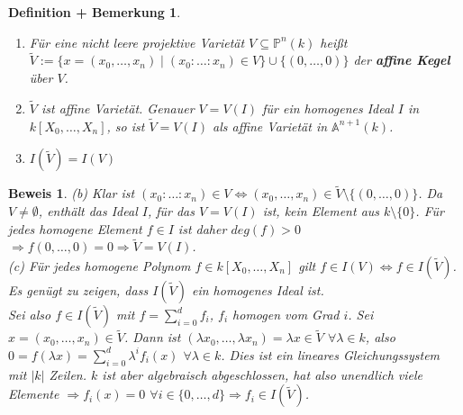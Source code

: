 \documentclass[a4paper,12pt]{report}
\theoremstyle{break}
\newtheorem{DefBem}[Def]{Definition + Bemerkung}
\theoremstyle{nonumberbreak}
\theoremstyle{nonumberplain}
\newtheorem{Bew}{Beweis}
\newcommand{\emp}[1]{\textbf{\emph{#1}}}
\newcommand{\begriff}[1]{{\index{#1}}\emp{#1}}
\begin{document}
\begin{DefBem}
 \label{defbem:8.10}
 \begin{enumerate}
  \item Für eine nicht leere projektive Varietät $V \subseteq \mathbb P^n(k)$ heißt \\
   $\tilde{V}:=\{x = (x_0,\dots ,x_n)\mid (x_0: \dots : x_n) \in V \} \cup \{(0, \dots, 0)\}$ der \begriff{affine Kegel} über $V$.
  \item $\tilde{V}$ ist affine Varietät. Genauer $V=V(I)$ für ein homogenes Ideal  $I$ in $k[X_0,\dots,X_n]$, so ist $\tilde{V}=V(I)$ als affine Varietät in $\mathbb A^{n+1}(k)$.
  \item $I(\tilde{V})=I(V)$
 \end{enumerate}
\end{DefBem}
\begin{Bew}
 (b) Klar ist $(x_0:\dots:x_n) \in V \Leftrightarrow (x_0, \dots , x_n) \in \tilde{V} \setminus \{(0,\dots,0)\}$. Da $V \ne \emptyset$, enthält das Ideal $I$, für das $V = V(I)$ ist, kein Element aus $k\setminus\{0\}$. Für jedes homogene Element $f \in I$ ist daher $deg(f) > 0$ $\Rightarrow f(0, \dots ,0)=0 \Rightarrow \tilde{V}=V(I)$. \\
 (c) Für jedes homogene Polynom $f \in k[X_0, \dots ,X_n]$ gilt $f \in I(V) \Leftrightarrow f \in I(\tilde{V})$. Es genügt zu zeigen, dass $I(\tilde{V})$ ein homogenes Ideal ist.\\
Sei also $f \in I(\tilde{V})$ mit $f= \sum_{i=0}^d{f_i}$, $f_i$ homogen vom Grad $i$. Sei $x=(x_0, \dots, x_n) \in \tilde{V}$. Dann ist $(\lambda x_0, \dots , \lambda x_n) = \lambda x \in \tilde{V}$ $\forall \lambda \in k$, also $0 = f(\lambda x) = \sum_{i=0}^d{\lambda^i f_i(x)}$ $\forall \lambda \in k$. Dies ist ein lineares Gleichungssystem mit $|k|$ Zeilen. $k$ ist aber algebraisch abgeschlossen, hat also unendlich viele Elemente $\Rightarrow f_i(x)=0$ $\forall i \in \{0, \dots, d\}\Rightarrow f_i\in I(\tilde{V})$.
\end{Bew}
\end{document}
